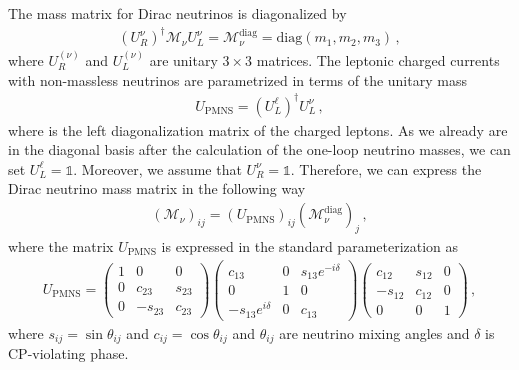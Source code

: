 \documentclass[12pt]{article}
\begin{document}
The mass matrix for Dirac neutrinos is diagonalized by
\begin{align}
(U^{\nu}_R)^{\dagger} \mathcal{M}_{\nu} U^{\nu}_L = \mathcal{M}_{\nu}^{\text{diag}} = \text{diag}(m_1, m_2, m_3)\,,
\end{align}
where $U^{(\nu)}_R$ and $U^{(\nu)}_L$ are unitary $3 \times 3$
matrices. The leptonic charged currents with non-massless neutrinos
are parametrized in terms of the unitary mass
\begin{align}
U_{\text{PMNS}} = \left( U^{\ell}_L \right)^{\dagger} U^{\nu}_L\,,
\end{align}
where is the left diagonalization matrix of the charged leptons.
As we already are in the diagonal basis after the calculation of the
one-loop neutrino masses, we can set
$U_{L}^{\ell} = \mathds{1}$. Moreover, we assume that $U_{R}^{\nu} = \mathds{1}$.
Therefore, we can express the Dirac neutrino mass matrix in the
following way
\begin{align}
(\mathcal{M}_{\nu})_{ij} = (U_{\text{PMNS}})_{ij} (\mathcal{M}_{\nu}^{\text{diag}})_{j}\,,
\end{align}
where the matrix $U_{\text{PMNS}}$ is expressed in the standard parameterization as
\begin{align}
U_{\text{PMNS}} = \begin{pmatrix}
    1 & 0		& 0 \\
    0 & c_{23}  & s_{23} \\
    0 & -s_{23} & c_{23}
\end{pmatrix}
\begin{pmatrix}
    c_{13}  &  0 & s_{13}e^{-i\delta} \\
    0 		&  1 & 0 \\
    -s_{13}e^{i\delta} &  0 & c_{13}
\end{pmatrix}
\begin{pmatrix}
    c_{12}  & s_{12} & 0 \\
    -s_{12} & c_{12} & 0 \\
    0		& 0		 & 1
\end{pmatrix}\,,
\end{align}
where $s_{ij} = \sin \theta_{ij}$ and $c_{ij} = \cos \theta_{ij}$ and $\theta_{ij}$ are neutrino mixing angles and $\delta$ is CP-violating phase.
\end{document}
